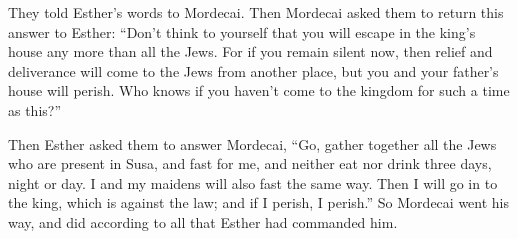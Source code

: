 {\par }{\PP {}They told Esther’s words to Mordecai.
Then Mordecai asked them to return this answer to Esther: “Don’t think to yourself that you will escape in the king’s house any more than all the Jews.
For if you remain silent now, then relief and deliverance will come to the Jews from another place, but you and your father’s house will perish. Who knows if you haven’t come to the kingdom for such a time as this?”
\par }{\PP {}Then Esther asked them to answer Mordecai,
“Go, gather together all the Jews who are present in Susa, and fast for me, and neither eat nor drink three days, night or day. I and my maidens will also fast the same way. Then I will go in to the king, which is against the law; and if I perish, I perish.”
So Mordecai went his way, and did according to all that Esther had commanded him.

}
